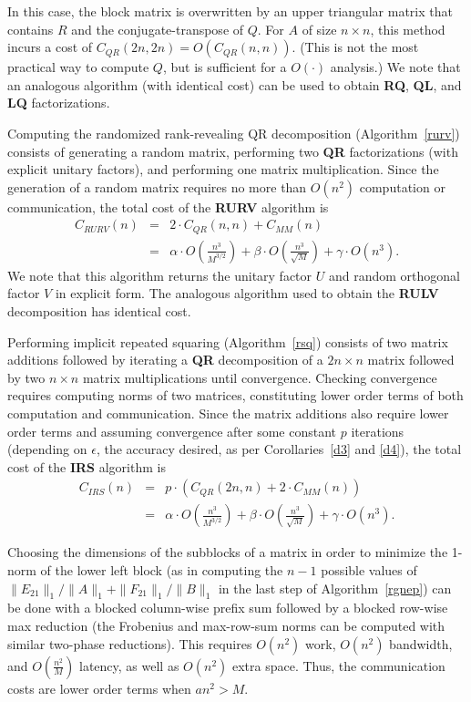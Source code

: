 \documentclass{article}
\def\lt{\left}
\def\rt{\right}
\theoremstyle{definition}
\begin{document}
In this case, the block matrix is overwritten by an upper triangular matrix that contains $R$ and the conjugate-transpose of $Q$. For $A$ of size $n\times n$, this method incurs a cost of $C_{QR}(2n,2n) = O( C_{QR}(n,n) )$. (This is not the most practical way to compute $Q$, but is sufficient for a $O( \cdot )$ analysis.)  We note that an analogous algorithm (with identical cost) can be used to obtain \textbf{RQ}, \textbf{QL}, and \textbf{LQ} factorizations.

Computing the randomized rank-revealing QR decomposition (Algorithm~\ref{rurv}) consists of generating a random matrix, performing two \textbf{QR} factorizations (with explicit unitary factors), and performing one matrix multiplication.  Since the generation of a random matrix requires no more than $O(n^2)$ computation or communication, the total cost of the \textbf{RURV} algorithm is
\begin{eqnarray*}
C_{RURV}(n) &=& 2\cdot C_{QR} (n,n) + C_{MM}(n) \\
&=&  \alpha \cdot O \lt(\frac{n^3}{M^{3/2}}\rt) + \beta \cdot O \lt(\frac{n^3}{\sqrt M}\rt) + \gamma \cdot O \lt(n^3\rt).
\end{eqnarray*}
We note that this algorithm returns the unitary factor $U$ and random orthogonal factor $V$ in explicit form.  The analogous algorithm used to obtain the \textbf{RULV} decomposition has identical cost.

Performing implicit repeated squaring (Algorithm~\ref{rsq}) consists of two matrix additions followed by iterating a \textbf{QR} decomposition of a $2n\times n$ matrix followed by two $n\times n$ matrix multiplications until convergence.  Checking convergence requires computing norms of two matrices, constituting lower order terms of both computation and communication. Since the matrix additions also require lower order terms and assuming convergence after some constant $p$ iterations (depending on $\epsilon$, the accuracy desired, as per Corollaries~\ref{d3} and \ref{d4}), the total cost of the \textbf{IRS} algorithm is
\begin{eqnarray*}
C_{IRS}(n) &=& p \cdot \lt( C_{QR}(2n,n) + 2\cdot C_{MM}(n) \rt)\\
&=& \alpha \cdot O \lt(\frac{n^3}{M^{3/2}}\rt) + \beta \cdot O \lt(\frac{n^3}{\sqrt M}\rt) + \gamma \cdot O \lt(n^3\rt).
\end{eqnarray*}

Choosing the dimensions of the subblocks of a matrix in order to minimize the 1-norm of the lower left block (as in computing the $n-1$ possible values of $\|E_{21}\|_1/\|A\|_1+\|F_{21}\|_1/\|B\|_1$ in the last step of Algorithm~\ref{rgnep}) can be done with a blocked column-wise prefix sum followed by a blocked row-wise max reduction (the Frobenius and max-row-sum norms can be computed with similar two-phase reductions).  This requires $O(n^2)$ work, $O(n^2)$ bandwidth, and $O\lt(\frac{n^2}{M}\rt)$ latency, as well as $O(n^2)$ extra space.  Thus, the communication costs are lower order terms when $an^2 > M$.
\end{document}
